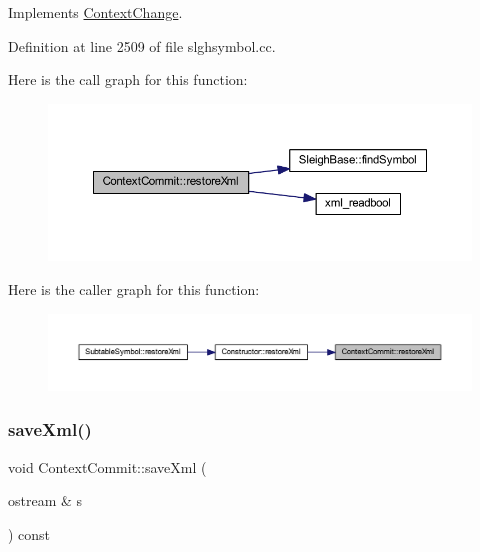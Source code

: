 Implements \mbox{\hyperlink{class_context_change_a95a77fd92582d479472c46e672262248}{Context\+Change}}.



Definition at line 2509 of file slghsymbol.\+cc.

Here is the call graph for this function\+:
\nopagebreak
\begin{figure}[H]
\begin{center}
\leavevmode
\includegraphics[width=350pt]{class_context_commit_ae695eedc084ebe7a75bd7f4d205518d0_cgraph}
\end{center}
\end{figure}
Here is the caller graph for this function\+:
\nopagebreak
\begin{figure}[H]
\begin{center}
\leavevmode
\includegraphics[width=350pt]{class_context_commit_ae695eedc084ebe7a75bd7f4d205518d0_icgraph}
\end{center}
\end{figure}
\mbox{\label{class_context_commit_a38e0c54f39dba0542a8433401980d78e}} 
\subsubsection{\texorpdfstring{saveXml()}{saveXml()}}
{\footnotesize\ttfamily void Context\+Commit\+::save\+Xml (\begin{DoxyParamCaption}\item[{ostream \&}]{s }\end{DoxyParamCaption}) const\hspace{0.3cm}{\ttfamily [virtual]}}



